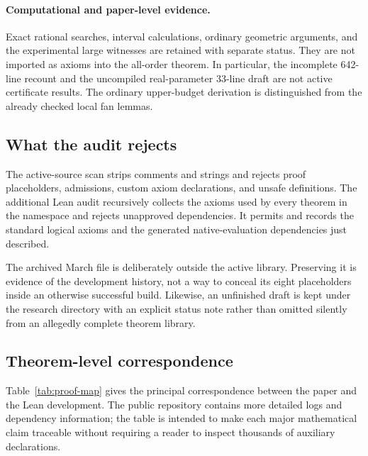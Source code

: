 \paragraph{Computational and paper-level evidence.}
Exact rational searches, interval calculations, ordinary geometric arguments, and the experimental large witnesses are retained with separate status. They are not imported as axioms into the all-order theorem. In particular, the incomplete 642-line recount and the uncompiled real-parameter 33-line draft are not active certificate results. The ordinary upper-budget derivation is distinguished from the already checked local fan lemmas.

\subsection{What the audit rejects}

The active-source scan strips comments and strings and rejects proof placeholders, admissions, custom axiom declarations, and unsafe definitions. The additional Lean audit recursively collects the axioms used by every theorem in the  namespace and rejects unapproved dependencies. It permits and records the standard logical axioms and the generated native-evaluation dependencies just described.

The archived March file is deliberately outside the active library. Preserving it is evidence of the development history, not a way to conceal its eight placeholders inside an otherwise successful build. Likewise, an unfinished draft is kept under the research directory with an explicit status note rather than omitted silently from an allegedly complete theorem library.

\subsection{Theorem-level correspondence}

Table~\ref{tab:proof-map} gives the principal correspondence between the paper and the Lean development. The public repository contains more detailed logs and dependency information; the table is intended to make each major mathematical claim traceable without requiring a reader to inspect thousands of auxiliary declarations.

